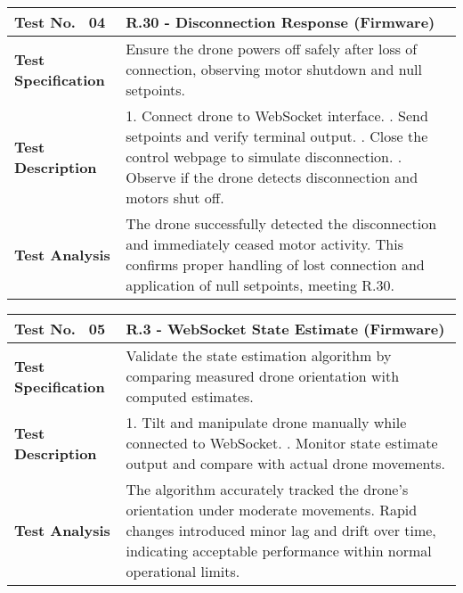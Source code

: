 \begin{table}[H]
\centering
\renewcommand{\arraystretch}{1.2}
\begin{tabular}{|p{3.5cm}|p{12cm}|}
\hline
\textbf{Test No. \, 04} & \textbf{R.30 - Disconnection Response} (Firmware) \\ \hline
\textbf{Test Specification} & 
Ensure the drone powers off safely after loss of connection, observing motor shutdown and null setpoints. \\ \hline
\textbf{Test Description} & 
1. Connect drone to WebSocket interface. \newline
2. Send setpoints and verify terminal output. \newline
3. Close the control webpage to simulate disconnection. \newline
4. Observe if the drone detects disconnection and motors shut off. \\ \hline
\textbf{Test Analysis} & 
The drone successfully detected the disconnection and immediately ceased motor activity. This confirms proper handling of lost connection and application of null setpoints, meeting R.30. \\ \hline
\end{tabular}
\end{table}

\begin{table}[H]
\centering
\renewcommand{\arraystretch}{1.2}
\begin{tabular}{|p{3.5cm}|p{12cm}|}
\hline
\textbf{Test No. \, 05} & \textbf{R.3 - WebSocket State Estimate} (Firmware) \\ \hline

\textbf{Test Specification} & 
Validate the state estimation algorithm by comparing measured drone orientation with computed estimates. \\ \hline

\textbf{Test Description} & 
1. Tilt and manipulate drone manually while connected to WebSocket. \newline
2. Monitor state estimate output and compare with actual drone movements. \\ \hline

\textbf{Test Analysis} & 
The algorithm accurately tracked the drone's orientation under moderate movements. Rapid changes introduced minor lag and drift over time, indicating acceptable performance within normal operational limits. \\ \hline
\end{tabular}
\end{table}


